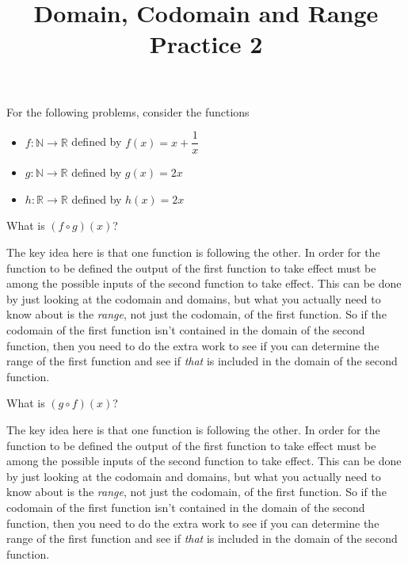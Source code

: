\documentclass{ximera}
\title{Domain, Codomain and Range Practice 2}
\begin{document}
For the following problems, consider the functions
\begin{itemize}
    \item $f:\mathbb{N}\rightarrow\mathbb{R}$ defined by $f(x) = x + \dfrac{1}{x}$
    \item $g:\mathbb{N}\rightarrow\mathbb{R}$ defined by $g(x) = 2x$
    \item $h:\mathbb{R}\rightarrow\mathbb{R}$ defined by $h(x) = 2x$
\end{itemize}

\begin{problem}
    What is $(f\circ g)(x)$? 
    \begin{multipleChoice}
    \end{multipleChoice}
    \begin{feedback}
        The key idea here is that one function is following the other. In order for the function to be defined the output of the first function to take effect must be among the possible inputs of the second function to take effect. This can be done by just looking at the codomain and domains, but what you actually need to know about is the \textit{range}, not just the codomain, of the first function. So if the codomain of the first function isn't contained in the domain of the second function, then you need to do the extra work to see if you can determine the range of the first function and see if \textit{that} is included in the domain of the second function.
    \end{feedback}
\end{problem}

\begin{problem}    
    What is $(g\circ f)(x)$? 
    \begin{multipleChoice}
    \begin{feedback}
        The key idea here is that one function is following the other. In order for the function to be defined the output of the first function to take effect must be among the possible inputs of the second function to take effect. This can be done by just looking at the codomain and domains, but what you actually need to know about is the \textit{range}, not just the codomain, of the first function. So if the codomain of the first function isn't contained in the domain of the second function, then you need to do the extra work to see if you can determine the range of the first function and see if \textit{that} is included in the domain of the second function.
    \end{feedback}
    \end{multipleChoice}
\end{problem}
\end{document}

